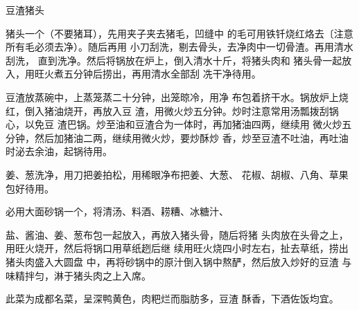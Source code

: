 \begin{recipe}{豆渣猪头}

\ingredients


\cooking

\step 猪头一个（不要猪耳），先用夹子夹去猪毛，凹缝中 的毛可用铁钎烧红烙去〔注意所有毛必须去净）。随后再用 小刀刮洗，剔去骨头，去净肉中一切骨渣。再用清水刮洗， 直到洗净。然后将锅放在炉上，倒入清水十斤，将猪头肉和 猪头骨一起放入，用旺火煮五分钟后捞出，再用清水全部刮 冼干净待用。

\step 豆渣放蒸碗中，上蒸笼蒸二十分钟，出笼晾冷，用净 布包着挤干水。锅放炉上烧红，倒入猪油烧开，再放入豆 渣，用微火炒五分钟。炒时注意常用汤瓢拨刮锅心，以免豆 渣巴锅。炒至油和豆渣合为一体时，再加猪油四两，继续用 微火炒五分钟，然后加猪油二两，继续用微火炒，要炒酥炒 香，炒至豆渣不吐油，再吐油时泌去余油，起锅待用。

\step 姜、葱洗净，用刀把姜拍松，用稀眼净布把姜、大葱、 花椒、胡椒、八角、草果包好待用。

必用大面砂锅一个，将清汤、料酒、耢糟、冰糖汁、

盐、酱油、姜、葱布包一起放入，再放入猪头骨，随后将猪 头肉放在头骨之上，用旺火烧开，然后将锅口用草纸趔后继 续用旺火烧四小时左右，扯去草纸，捞出猪头肉盛入大圆盘 中，再将砂锅中的原汁倒入锅中熬酽，然后放入炒好的豆渣 与味精拌匀，淋于猪头肉之上入席。

\notes

此菜为成都名菜，呈深鸭黄色，肉粑烂而脂肪多，豆渣 酥香，下酒佐饭均宜。

\end{recipe}

